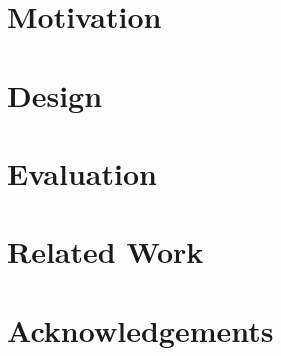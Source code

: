 \documentclass[letterpaper,twocolumn,10pt]{article}
\begin{document}
\section{Motivation}

\section{Design}

\section{Evaluation}

\section{Related Work}

\section{Acknowledgements}




\end{document}
